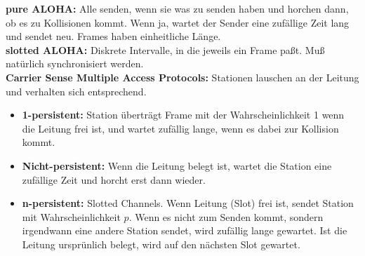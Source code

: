 \documentclass[10pt,a4paper]{scrartcl}
\begin{document}
\textbf{pure ALOHA:} Alle senden, wenn sie was zu senden haben und horchen dann, ob es zu Kollisionen kommt. Wenn ja, wartet der Sender eine zufällige Zeit lang und sendet neu. Frames haben einheitliche Länge.\\
\textbf{slotted ALOHA:} Diskrete Intervalle, in die jeweils ein Frame paßt. Muß natürlich synchronisiert werden. \\

\textbf{Carrier Sense Multiple Access Protocols:} Stationen lauschen an der Leitung und verhalten sich entsprechend.
\begin{itemize}
\item \textbf{1-persistent:} Station überträgt Frame mit der Wahrscheinlichkeit 1 wenn die Leitung frei ist, und wartet zufällig lange, wenn es dabei zur Kollision kommt.
\item \textbf{Nicht-persistent:} Wenn die Leitung belegt ist, wartet die Station eine zufällige Zeit und horcht erst dann wieder.
\item \textbf{n-persistent:} Slotted Channels. Wenn Leitung (Slot) frei ist, sendet Station mit Wahrscheinlichkeit $p$. Wenn es nicht zum Senden kommt, sondern irgendwann eine andere Station sendet, wird zufällig lange gewartet. Ist die Leitung ursprünlich belegt, wird auf den nächsten Slot gewartet. 
\end{itemize}
\end{document}
